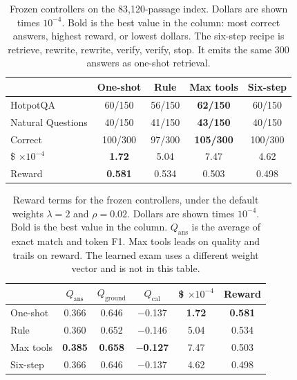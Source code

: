 \documentclass[letterpaper]{article} %
\begin{document}
\begin{table}[t]
\centering
\small
\setlength{\tabcolsep}{4pt}
\begin{tabular}{lcccc}
\toprule
 & One-shot & Rule & Max tools & Six-step \\
\midrule
HotpotQA & 60/150 & 56/150 & \textbf{62/150} & 60/150 \\
Natural Questions & 40/150 & 41/150 & \textbf{43/150} & 40/150 \\
Correct & 100/300 & 97/300 & \textbf{105/300} & 100/300 \\
\$ \(\times 10^{-4}\) & \textbf{1.72} & 5.04 & 7.47 & 4.62 \\
Reward & \textbf{0.581} & 0.534 & 0.503 & 0.498 \\
\bottomrule
\end{tabular}
\caption{Frozen controllers on the 83{,}120-passage index. Dollars are shown times \(10^{-4}\). Bold is the best value in the column: most correct answers, highest reward, or lowest dollars. The six-step recipe is retrieve, rewrite, rewrite, verify, verify, stop. It emits the same 300 answers as one-shot retrieval.}
\label{tab:frozen}
\end{table}

\begin{table}[t]
\centering
\small
\setlength{\tabcolsep}{3.5pt}
\begin{tabular}{lccccc}
\toprule
 & \(Q_{\mathrm{ans}}\) & \(Q_{\mathrm{ground}}\) & \(Q_{\mathrm{cal}}\) & \$ \(\times 10^{-4}\) & Reward \\
\midrule
One-shot & 0.366 & 0.646 & \(-\)0.137 & \textbf{1.72} & \textbf{0.581} \\
Rule & 0.360 & 0.652 & \(-\)0.146 & 5.04 & 0.534 \\
Max tools & \textbf{0.385} & \textbf{0.658} & \textbf{\(-\)0.127} & 7.47 & 0.503 \\
Six-step & 0.366 & 0.646 & \(-\)0.137 & 4.62 & 0.498 \\
\bottomrule
\end{tabular}
\caption{Reward terms for the frozen controllers, under the default weights \(\lambda{=}2\) and \(\rho{=}0.02\). Dollars are shown times \(10^{-4}\). Bold is the best value in the column. \(Q_{\mathrm{ans}}\) is the average of exact match and token F1. Max tools leads on quality and trails on reward. The learned exam uses a different weight vector and is not in this table.}
\label{tab:terms}
\end{table}
\end{document}
